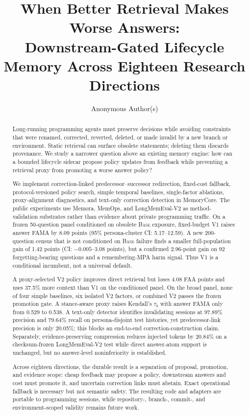 \documentclass[10pt]{article}
\title{When Better Retrieval Makes Worse Answers:\\
Downstream-Gated Lifecycle Memory Across Eighteen Research Directions}
\author{Anonymous Author(s)}
\date{}
\newcommand{\base}{\textsc{Base}\xspace}
\newcommand{\vone}{\textsc{V1}\xspace}
\newcommand{\vtwo}{\textsc{V2}\xspace}
\begin{document}
\maketitle

\begin{abstract}
Long-running programming agents must preserve decisions while avoiding constraints that were renamed, corrected, reverted, deleted, or made invalid by a new branch or environment. Static retrieval can surface obsolete statements; deleting them discards provenance. We study a narrower question above an existing memory engine: how can a bounded lifecycle sidecar propose policy updates from feedback while preventing a retrieval proxy from promoting a worse answer policy?

We implement correction-linked predecessor--successor redirection, fixed-cost fallback, protocol-versioned policy search, simple temporal baselines, single-factor ablations, proxy-alignment diagnostics, and text-only correction detection in MemoryCore. The public experiments use Memora, MemOps, and LongMemEval-V2 as method-validation substrates rather than evidence about private programming traffic. On a frozen 50-question panel conditioned on obsolete \base exposure, fixed-budget \vone raises answer FAMA by 8.09 points (95\% persona-cluster CI: 5.17--12.59). A new 200-question census that is not conditioned on \base failure finds a smaller full-population gain of 1.42 points (CI: $-0.005$--3.08 points), but a confirmed 2.96-point gain on 92 forgetting-bearing questions and a remembering-MPA harm signal. Thus \vone is a conditional incumbent, not a universal default.

A proxy-selected \vtwo policy improves direct retrieval but loses 4.08 FAA points and uses 37.5\% more context than \vone on the conditioned panel. On the broad panel, none of four simple baselines, six isolated \vtwo factors, or combined \vtwo passes the frozen promotion gate. A stance-aware proxy raises Kendall's $\tau_b$ with answer FAMA only from 0.529 to 0.538. A text-only detector identifies invalidating sessions at 97.89\% precision and 79.64\% recall on persona-disjoint test histories, yet predecessor-link precision is only 20.05\%; this blocks an end-to-end correction-construction claim. Separately, evidence-preserving compression reduces injected tokens by 20.84\% on a checksum-frozen LongMemEval-V2 test while direct answer-atom support is unchanged, but no answer-level noninferiority is established.

Across eighteen directions, the durable result is a separation of proposal, promotion, and evidence scope: cheap feedback may propose a policy, downstream answers and cost must promote it, and uncertain correction links must abstain. Exact operational fallback is necessary but not semantic safety. The resulting code and adapters are portable to programming sessions, while repository-, branch-, commit-, and environment-scoped validity remains future work.
\end{abstract}
\end{document}
